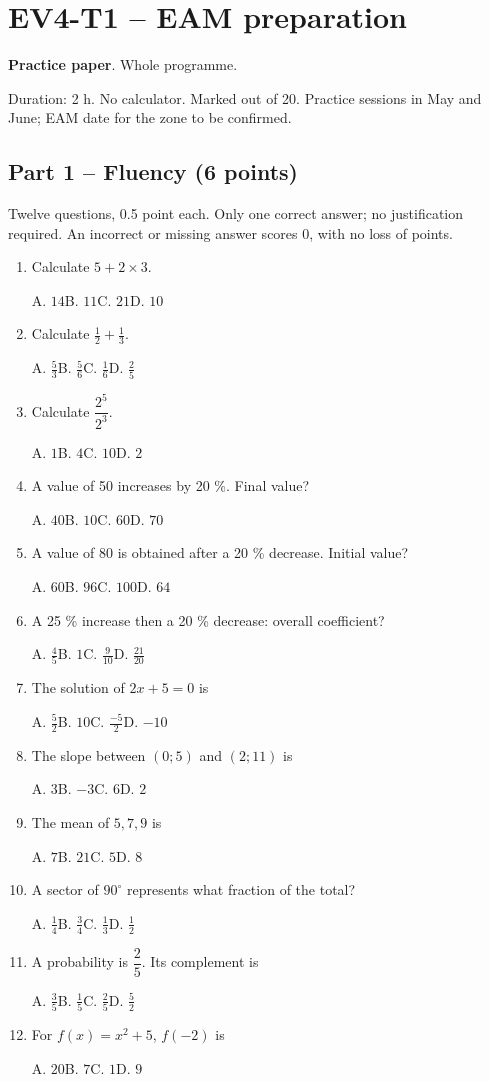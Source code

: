 \clearpage\section*{EV4-T1 -- EAM preparation}\label{EV4-T1}
\textbf{Practice paper}. Whole programme.\par Duration: 2 h. No calculator. Marked out of 20. Practice sessions in May and June; EAM date for the zone to be confirmed.
\subsection*{Part 1 -- Fluency (6 points)}
Twelve questions, 0.5 point each. Only one correct answer; no justification required. An incorrect or missing answer scores 0, with no loss of points.
\begin{enumerate}
\item Calculate $5+2\times3$.\par A. $14$\quad B. $11$\quad C. $21$\quad D. $10$
\item Calculate $\frac12+\frac13$.\par A. $\frac{5}{3}$\quad B. $\frac{5}{6}$\quad C. $\frac{1}{6}$\quad D. $\frac{2}{5}$
\item Calculate $\dfrac{2^5}{2^{3}}$.\par A. $1$\quad B. $4$\quad C. $10$\quad D. $2$
\item A value of 50 increases by 20 \%. Final value?\par A. $40$\quad B. $10$\quad C. $60$\quad D. $70$
\item A value of 80 is obtained after a 20 \% decrease. Initial value?\par A. $60$\quad B. $96$\quad C. $100$\quad D. $64$
\item A 25 \% increase then a 20 \% decrease: overall coefficient?\par A. $\frac{4}{5}$\quad B. $1$\quad C. $\frac{9}{10}$\quad D. $\frac{21}{20}$
\item The solution of $2x+5=0$ is\par A. $\frac{5}{2}$\quad B. $10$\quad C. $\frac{-5}{2}$\quad D. $-10$
\item The slope between $(0;5)$ and $(2;11)$ is\par A. $3$\quad B. $-3$\quad C. $6$\quad D. $2$
\item The mean of $5, 7, 9$ is\par A. $7$\quad B. $21$\quad C. $5$\quad D. $8$
\item A sector of $90^\circ$ represents what fraction of the total?\par A. $\frac{1}{4}$\quad B. $\frac{3}{4}$\quad C. $\frac{1}{3}$\quad D. $\frac{1}{2}$
\item A probability is $\dfrac{2}{5}$. Its complement is\par A. $\frac{3}{5}$\quad B. $\frac{1}{5}$\quad C. $\frac{2}{5}$\quad D. $\frac{5}{2}$
\item For $f(x)=x^2+5$, $f(-2)$ is\par A. $20$\quad B. $7$\quad C. $1$\quad D. $9$
\end{enumerate}
